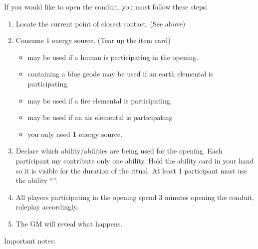 \documentclass[green]{elementals}
\begin{document}
If you would like to open the conduit, you must follow these steps:
\begin{enumerate}
  \item Locate the current point of closest contact. (See above)
  \item Consume 1 energy source. (Tear up the item card)
  \begin{itemize}
  	\item \iBattery{} may be used if a human is participating in the opening.
  	\item \iCrystalGeode{} containing a blue geode may be used if an earth elemental is participating.
  	\item \iLavaEmber{} may be used if a fire elemental is participating.
  	\item \iHandCrank{} may be used if an air elemental is participating
  	\item you only need {\bf 1} energy source.
  \end{itemize}
  \item Declare which ability/abilities are being used for the opening. Each participant my contribute only one ability. Hold the ability card in your hand so it is visible for the duration of the ritual. At least 1 participant must use the ability ``\aWorkConduit{}''. 
  \item All players participating in the opening spend 3 minutes opening the conduit, roleplay accordingly.
  \item The GM will reveal what happens.
\end{enumerate}

\vspace{10mm}

{\large Important notes:}
\end{document}
